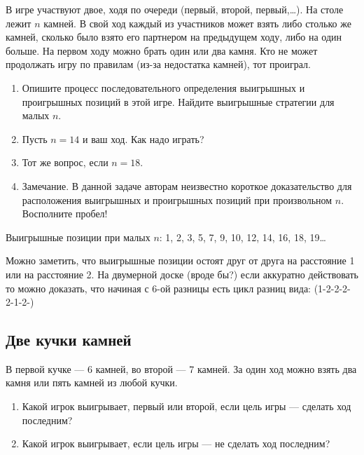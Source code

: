 \begin{problem}
\begin{source}
\cite{savva:nmu}
\end{source}
 В игре участвуют двое, ходя по очереди (первый, второй, первый,\ldots ). На столе лежит $n$ камней. В свой ход каждый из участников может взять либо столько же камней, сколько было взято его партнером на предыдущем ходу, либо на один больше. На первом ходу можно брать один или два камня. Кто не может продолжать игру по правилам (из-за недостатка камней), тот проиграл.
\begin{enumerate}
\item Опишите процесс последовательного определения выигрышных и проигрышных позиций в этой игре. Найдите выигрышные стратегии для малых $n$.
\item Пусть $n=14$ и ваш ход. Как надо играть?
\item  Тот же вопрос, если $n=18$.
\item Замечание. В данной задаче авторам неизвестно короткое доказательство для  расположения выигрышных и проигрышных позиций при произвольном $n$. Восполните пробел!
\end{enumerate}






\begin{sol}
Выигрышные позиции при малых $n$: 1, 2, 3, 5, 7, 9, 10, 12, 14, 16, 18, 19\ldots

Можно заметить, что выигрышные позиции остоят друг от друга на расстояние 1 или на расстояние 2. На двумерной доске (вроде бы?)  если аккуратно действовать то можно доказать, что начиная с 6-ой разницы есть цикл разниц вида: (1-2-2-2-2-1-2-)
\end{sol}
\end{problem}

\subsection{Две кучки камней}

\begin{problem}\par
В первой кучке — 6 камней, во второй — 7 камней. За один ход можно взять два камня или пять камней из любой кучки.\par
\begin{enumerate}
\item	Какой игрок выигрывает, первый или второй, если цель игры — сделать ход последним?\par
\item	Какой игрок выигрывает, если цель игры — не сделать ход последним?
\end{enumerate}


\begin{sol}

\end{sol}
\end{problem}


